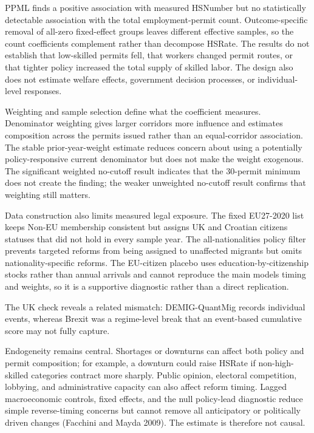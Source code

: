\documentclass[11pt,a4paper]{article}
\begin{document}
PPML finds a positive association with measured HSNumber but no
statistically detectable association with the total employment-permit
count. Outcome-specific removal of all-zero fixed-effect groups leaves
different effective samples, so the count coefficients complement rather
than decompose HSRate. The results do not establish that low-skilled
permits fell, that workers changed permit routes, or that tighter policy
increased the total supply of skilled labor. The design also does not
estimate welfare effects, government decision processes, or
individual-level responses.

Weighting and sample selection define what the coefficient measures.
Denominator weighting gives larger corridors more influence and
estimates composition across the permits issued rather than an
equal-corridor association. The stable prior-year-weight estimate
reduces concern about using a potentially policy-responsive current
denominator but does not make the weight exogenous. The significant
weighted no-cutoff result indicates that the 30-permit minimum does not
create the finding; the weaker unweighted no-cutoff result confirms that
weighting still matters.

Data construction also limits measured legal exposure. The fixed
EU27-2020 list keeps Non-EU membership consistent but assigns UK and
Croatian citizens statuses that did not hold in every sample year. The
all-nationalities policy filter prevents targeted reforms from being
assigned to unaffected migrants but omits nationality-specific reforms.
The EU-citizen placebo uses education-by-citizenship stocks rather than
annual arrivals and cannot reproduce the main model\textquotesingle s
timing and weights, so it is a supportive diagnostic rather than a
direct replication.

The UK check reveals a related mismatch: DEMIG-QuantMig records
individual events, whereas Brexit was a regime-level break that an
event-based cumulative score may not fully capture.

Endogeneity remains central. Shortages or downturns can affect both
policy and permit composition; for example, a downturn could raise
HSRate if non-high-skilled categories contract more sharply. Public
opinion, electoral competition, lobbying, and administrative capacity
can also affect reform timing. Lagged macroeconomic controls, fixed
effects, and the null policy-lead diagnostic reduce simple
reverse-timing concerns but cannot remove all anticipatory or
politically driven changes (Facchini and Mayda 2009). The estimate is
therefore not causal.
\end{document}
